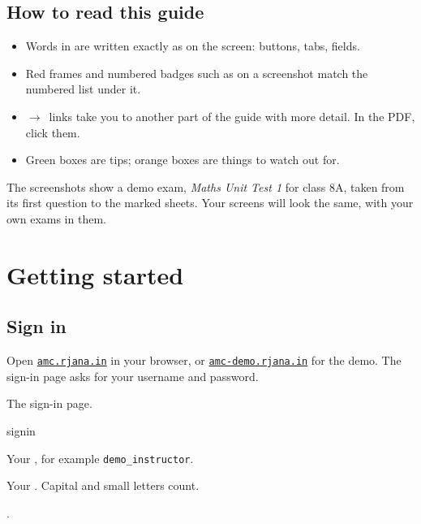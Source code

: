 \documentclass[11pt]{article}
\newcommand\portal{\href{https://amc.rjana.in}{\texttt{amc.rjana.in}}}
\newcommand\demoportal{\href{https://amc-demo.rjana.in}{\texttt{amc-demo.rjana.in}}}
\newcommand\demouser{\texttt{demo\_instructor}}
\begin{document}
\subsection{How to read this guide}

\begin{itemize}
  \item Words in  are written exactly as on the screen: buttons, tabs, fields.
  \item Red frames and numbered badges such as  on a screenshot match the numbered list under it.
  \item \textcolor{brand}{$\rightarrow$}~links take you to another part of the guide with more detail. In the PDF, click them.
  \item Green boxes are tips; orange boxes are things to watch out for.
\end{itemize}

The screenshots show a demo exam, \emph{Maths Unit Test 1} for class 8A, taken from its first question to the marked sheets. Your screens will look the same, with your own exams in them.

\section{Getting started}\label{sec:start}

\subsection{Sign in}

Open \portal{} in your browser, or \demoportal{} for the demo. The sign-in page asks for your username and password.

\begin{keep}
\begin{guidefig}{The sign-in page.}
\begin{shot}[0.5\linewidth]{signin}
\end{shot}
\end{guidefig}
\begin{callouts}
  \item Your , for example \demouser.
  \item Your . Capital and small letters count.
  \item {}.
\end{callouts}
\end{keep}
\end{document}
